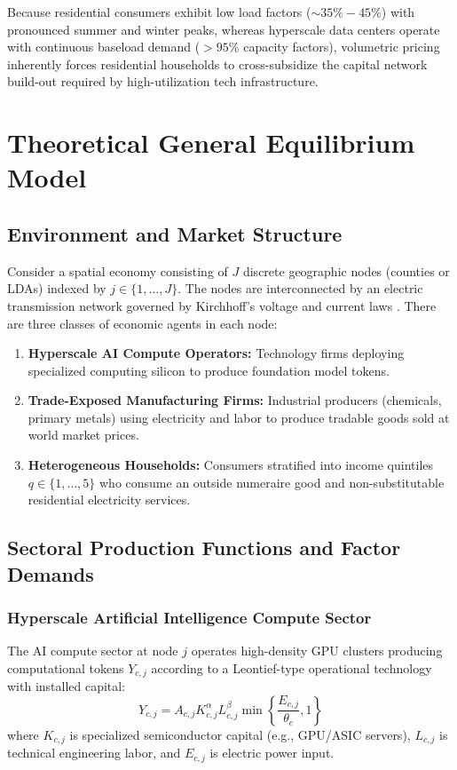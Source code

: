 \documentclass[11pt,a4paper]{article}
\begin{document}
Because residential consumers exhibit low load factors ($\sim 35\% - 45\%$) with pronounced summer and winter peaks, whereas hyperscale data centers operate with continuous baseload demand ($>95\%$ capacity factors), volumetric pricing inherently forces residential households to cross-subsidize the capital network build-out required by high-utilization tech infrastructure.

\newpage

\section{Theoretical General Equilibrium Model}\label{sec:model}

\subsection{Environment and Market Structure}

Consider a spatial economy consisting of $J$ discrete geographic nodes (counties or LDAs) indexed by $j \in \{1, \dots, J\}$. The nodes are interconnected by an electric transmission network governed by Kirchhoff's voltage and current laws \citep{joskow2000transmission}. There are three classes of economic agents in each node:
\begin{enumerate}
    \item \textbf{Hyperscale AI Compute Operators:} Technology firms deploying specialized computing silicon to produce foundation model tokens.
    \item \textbf{Trade-Exposed Manufacturing Firms:} Industrial producers (chemicals, primary metals) using electricity and labor to produce tradable goods sold at world market prices.
    \item \textbf{Heterogeneous Households:} Consumers stratified into income quintiles $q \in \{1, \dots, 5\}$ who consume an outside numeraire good and non-substitutable residential electricity services.
\end{enumerate}

\subsection{Sectoral Production Functions and Factor Demands}

\subsubsection{Hyperscale Artificial Intelligence Compute Sector}
The AI compute sector at node $j$ operates high-density GPU clusters producing computational tokens $Y_{c,j}$ according to a Leontief-type operational technology with installed capital:
\begin{equation}
    Y_{c,j} = A_{c,j} K_{c,j}^\alpha L_{c,j}^\beta \min\left\{ \frac{E_{c,j}}{\theta_e}, 1 \right\}
\end{equation}
where $K_{c,j}$ is specialized semiconductor capital (e.g., GPU/ASIC servers), $L_{c,j}$ is technical engineering labor, and $E_{c,j}$ is electric power input. 
\end{document}
